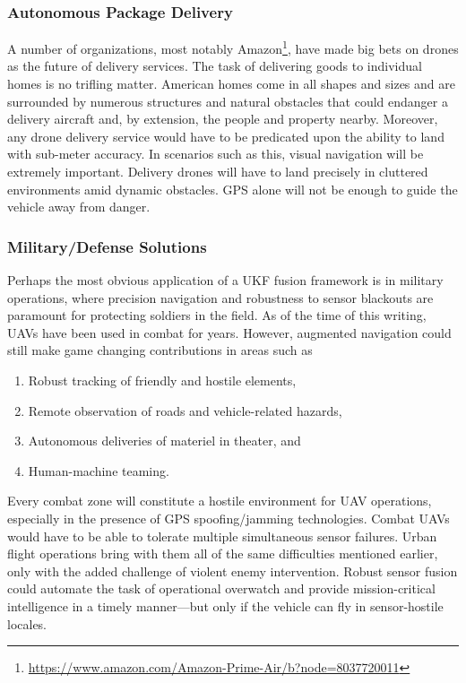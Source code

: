 \subsubsection{Autonomous Package Delivery}

A number of organizations, most notably Amazon\footnote{\url{https://www.amazon.com/Amazon-Prime-Air/b?node=8037720011}}, have made big bets on drones as the future of delivery services. The task of delivering goods to individual homes is no trifling matter. American homes come in all shapes and sizes and are surrounded by numerous structures and natural obstacles that could endanger a delivery aircraft and, by extension, the people and property nearby. Moreover, any drone delivery service would have to be predicated upon the ability to land with sub-meter accuracy. In scenarios such as this, visual navigation will be extremely important. Delivery drones will have to land precisely in cluttered environments amid dynamic obstacles. GPS alone will not be enough to guide the vehicle away from danger. 

\subsubsection{Military/Defense Solutions}

Perhaps the most obvious application of a UKF fusion framework is in military operations, where precision navigation and robustness to sensor blackouts are paramount for protecting soldiers in the field. As of the time of this writing, UAVs have been used in combat for years. However, augmented navigation could still make game changing contributions in areas such as
\begin{enumerate}
    \item Robust tracking of friendly and hostile elements,
    \item Remote observation of roads and vehicle-related hazards,
    \item Autonomous deliveries of materiel in theater, and
    \item Human-machine teaming.
\end{enumerate}
Every combat zone will constitute a hostile environment for UAV operations, especially in the presence of GPS spoofing/jamming technologies. Combat UAVs would have to be able to tolerate multiple simultaneous sensor failures. Urban flight operations bring with them all of the same difficulties mentioned earlier, only with the added challenge of violent enemy intervention. Robust sensor fusion could automate the task of operational overwatch and provide mission-critical intelligence in a timely manner---but only if the vehicle can fly in sensor-hostile locales.